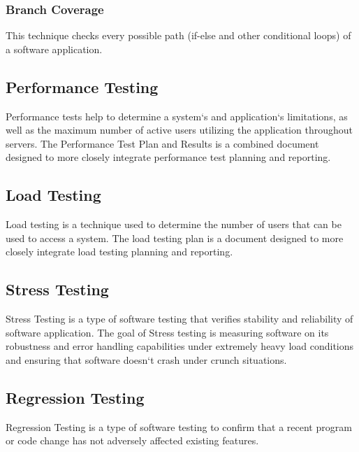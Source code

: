 \subsubsection{ Branch Coverage}
This technique checks every possible path (if-else and other conditional loops) of a software
application.

\subsection{Performance Testing}
Performance tests help to determine a system`s and application`s limitations, as well as the maximum
number of active users utilizing the application throughout servers. The Performance Test Plan and
Results is a combined document designed to more closely integrate performance test planning and
reporting.

\subsection{Load Testing}
Load testing is a technique used to determine the number of users that can be used to access a system.
The load testing plan is a document designed to more closely integrate load testing planning and
reporting.

\subsection{Stress Testing}
Stress Testing is a type of software testing that verifies stability and reliability of software application.
The goal of Stress testing is measuring software on its robustness and error handling capabilities
under extremely heavy load conditions and ensuring that software doesn`t crash under crunch
situations.
\subsection{Regression Testing}
Regression Testing is a type of software testing to confirm that a recent program or code change has
not adversely affected existing features.